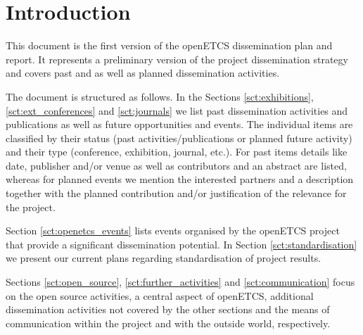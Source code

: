 ﻿\section{Introduction}

This document is the first version of the openETCS dissemination plan and report. It represents a preliminary version of the project dissemination strategy and covers past and as well as planned dissemination activities.

The document is structured as follows. In the Sections \ref{sct:exhibitions}, \ref{sct:ext_conferences} and \ref{sct:journals} we list past dissemination activities and publications as well as future opportunities and events. The individual items are classified by their status (past activities/publications or planned future activity) and their type (conference, exhibition, journal, etc.). For past items details like date, publisher and/or venue as well as contributors and an abstract are listed, whereas for planned events we mention the interested partners and a description together with the planned contribution and/or justification of the relevance for the project.

Section \ref{sct:openetcs_events} lists events organised by the openETCS project that provide a significant dissemination potential. In Section \ref{sct:standardisation} we present our current plans regarding standardisation of project results.

Sections \ref{sct:open_source}, \ref{sct:further_activities} and \ref{sct:communication} focus on the open source activities, a central aspect of openETCS, additional dissemination activities not covered by the other sections and the means of communication within the project and with the outside world, respectively.
